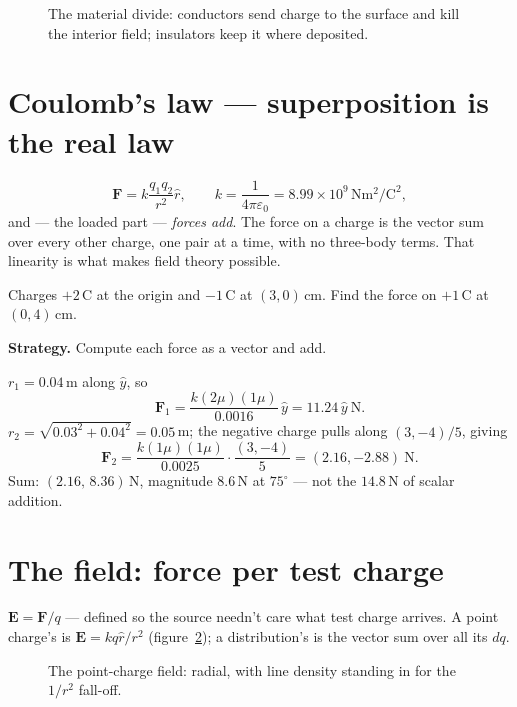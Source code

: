 \begin{figure}[htbp]\centering

\caption{The material divide: conductors send charge to the surface and
kill the interior field; insulators keep it where deposited.}
\label{fig:cond}
\end{figure}

\section{Coulomb's law --- superposition is the real law}\label{sec:ef-coul}

\begin{equation}
  \mathbf F=k\frac{q_1q_2}{r^{2}}\hat r,\qquad
  k=\frac{1}{4\pi\varepsilon_0}=8.99\times10^{9}\,\mathrm{Nm^{2}/C^{2}},
  \label{eq:coul}
\end{equation}
and --- the loaded part --- \emph{forces add}. The force on a charge is
the vector sum over every other charge, one pair at a time, with no
three-body terms. That linearity is what makes field theory possible.

\begin{example}\label{ex:superp}
Charges $+2$\,\textmu C at the origin and $-1$\,\textmu C at
$(3,0)$\,cm. Find the force on $+1$\,\textmu C at $(0,4)$\,cm.
\par\smallskip
\textbf{Strategy.} Compute each force as a vector and add.
\begin{solution}
$r_1=0.04$\,m along $\hat y$, so
\[\mathbf F_1=\frac{k(2\mu)(1\mu)}{0.0016}\,\hat y=11.24\,\hat y\ \text{N}.\]
$r_2=\sqrt{0.03^{2}+0.04^{2}}=0.05$\,m; the negative charge pulls along
$(3,-4)/5$, giving
\[\mathbf F_2=\frac{k(1\mu)(1\mu)}{0.0025}\cdot\frac{(3,-4)}{5}
=(2.16,-2.88)\ \text{N}.\]
Sum: $(2.16,\,8.36)$\,N, magnitude $8.6$\,N at $75^{\circ}$ ---
not the $14.8$\,N of scalar addition. \checkmark
\end{solution}
\end{example}

\section{The field: force per test charge}\label{sec:ef-field}

$\mathbf E=\mathbf F/q$ --- defined so the source needn't care what test
charge arrives. A point charge's is
$\mathbf E=kq\hat r/r^{2}$ (figure~\ref{fig:pt}); a distribution's is the
vector sum over all its $dq$.

\begin{figure}[htbp]\centering

\caption{The point-charge field: radial, with line density standing in
for the $1/r^{2}$ fall-off.}
\label{fig:pt}
\end{figure}


